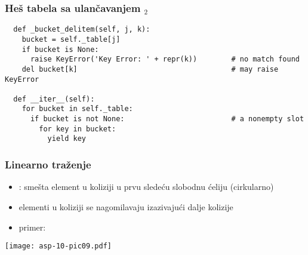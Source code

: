 \documentclass[compress]{beamer}
\begin{document}
\begin{frame}[fragile,shrink=25]
  \frametitle{Heš tabela sa ulančavanjem $_2$}
\begin{verbatim}
  def _bucket_delitem(self, j, k):
    bucket = self._table[j]
    if bucket is None:
      raise KeyError('Key Error: ' + repr(k))        # no match found
    del bucket[k]                                    # may raise KeyError

  def __iter__(self):
    for bucket in self._table:
      if bucket is not None:                         # a nonempty slot
        for key in bucket:
          yield key
\end{verbatim}
\end{frame}

\begin{frame}[fragile]
  \frametitle{Linearno traženje}
  \begin{itemize}
    \item {}: smešta element u koliziji u prvu sledeću slobodnu ćeliju (cirkularno)
    \item elementi u koliziji se nagomilavaju izazivajući dalje kolizije
    \item primer:
  \end{itemize}
  \begin{center}
    \texttt{[image: asp-10-pic09.pdf]}
  \end{center}
\end{frame}
\end{document}

